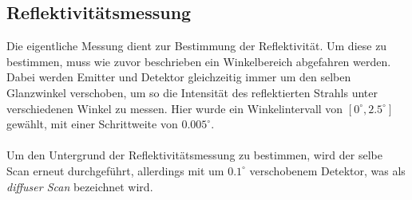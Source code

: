\subsection{Reflektivitätsmessung}
Die eigentliche Messung dient zur Bestimmung der Reflektivität. Um diese zu bestimmen, muss wie zuvor beschrieben ein Winkelbereich abgefahren werden. Dabei werden Emitter und Detektor gleichzeitig immer um den selben Glanzwinkel verschoben, um so die Intensität des reflektierten Strahls unter verschiedenen Winkel zu messen. Hier wurde ein Winkelintervall von $[0^\circ,2.5^\circ]$ gewählt, mit einer Schrittweite von $0.005^\circ$.\\
\\
Um den Untergrund der Reflektivitätsmessung zu bestimmen, wird der selbe Scan erneut durchgeführt, allerdings mit um $0.1^\circ$ verschobenem Detektor, was als \textit{diffuser Scan} bezeichnet wird. 
\cite{Anleitung44}
